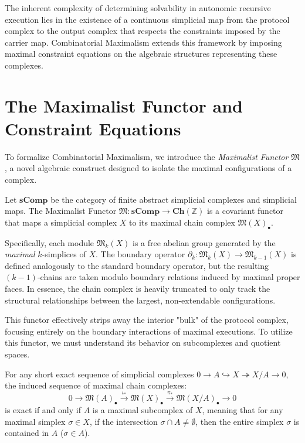 The inherent complexity of determining solvability in autonomic recursive execution lies in the existence of a continuous simplicial map from the protocol complex to the output complex that respects the constraints imposed by the carrier map. Combinatorial Maximalism extends this framework by imposing maximal constraint equations on the algebraic structures representing these complexes.

\section{The Maximalist Functor and Constraint Equations}

To formalize Combinatorial Maximalism, we introduce the \textit{Maximalist Functor} $\mathfrak{M}$, a novel algebraic construct designed to isolate the maximal configurations of a complex.

\begin{definition}
Let $\mathbf{sComp}$ be the category of finite abstract simplicial complexes and simplicial maps. The Maximalist Functor $\mathfrak{M}: \mathbf{sComp} \to \mathbf{Ch}(\mathbb{Z})$ is a covariant functor that maps a simplicial complex $X$ to its maximal chain complex $\mathfrak{M}(X)_{\bullet}$. 

Specifically, each module $\mathfrak{M}_k(X)$ is a free abelian group generated by the \textit{maximal} $k$-simplices of $X$. The boundary operator $\partial_k: \mathfrak{M}_k(X) \to \mathfrak{M}_{k-1}(X)$ is defined analogously to the standard boundary operator, but the resulting $(k-1)$-chains are taken modulo boundary relations induced by maximal proper faces. In essence, the chain complex is heavily truncated to only track the structural relationships between the largest, non-extendable configurations.
\end{definition}

This functor effectively strips away the interior "bulk" of the protocol complex, focusing entirely on the boundary interactions of maximal executions. To utilize this functor, we must understand its behavior on subcomplexes and quotient spaces.

\begin{lemma}
\label{lem:exactness}
For any short exact sequence of simplicial complexes $0 \to A \hookrightarrow X \twoheadrightarrow X/A \to 0$, the induced sequence of maximal chain complexes:
\[
0 \to \mathfrak{M}(A)_{\bullet} \xrightarrow{\iota_*} \mathfrak{M}(X)_{\bullet} \xrightarrow{\pi_*} \mathfrak{M}(X/A)_{\bullet} \to 0
\]
is exact if and only if $A$ is a maximal subcomplex of $X$, meaning that for any maximal simplex $\sigma \in X$, if the intersection $\sigma \cap A \neq \emptyset$, then the entire simplex $\sigma$ is contained in $A$ ($\sigma \in A$).
\end{lemma}

